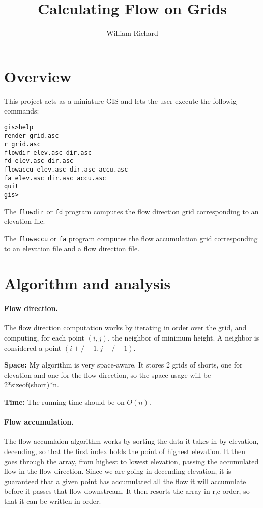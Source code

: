 \documentclass[11pt,twocolumn]{article}
\begin{document}
\title{Calculating Flow on Grids}
\author{William Richard}
\maketitle 



\section{Overview}

This project acts as a miniature GIS and lets the user execute the
followig commands: 
\begin{verbatim}
gis>help
render grid.asc
r grid.asc
flowdir elev.asc dir.asc
fd elev.asc dir.asc
flowaccu elev.asc dir.asc accu.asc
fa elev.asc dir.asc accu.asc
quit
gis>
\end{verbatim}

The \texttt{flowdir} or \texttt{fd} program computes the flow direction grid
corresponding to an elevation file. 


The \texttt{flowaccu} or \texttt{fa} program computes the flow accumulation grid
corresponding to an elevation file and a flow direction file.


\section{Algorithm and analysis}

\paragraph{Flow direction. }
The flow direction computation works by
iterating in order over the grid, and computing, for each point
$(i,j)$, the neighbor of minimum height. A neighbor is considered a
point $(i+/-1, j+/-1)$.

{\bf Space:} My algorithm is very space-aware. It stores 2 grids of
shorts, one for elevation and one for the flow direction, so the space
usage will be 2*sizeof(short)*n. 

{\bf Time: } The running time should be on $O(n)$.


\paragraph{Flow accumulation.} The flow accumlaion algorithm works by
sorting the data it takes in by elevation, decending, so that the
first index holds the point of highest elevation.  It then goes
through the array, from highest to lowest elevation, passing the
accumulated flow in the flow direction.  Since we are going in
decending elevation, it is guaranteed that a given point has
accumulated all the flow it will accumulate before it passes that flow
downstream.  It then resorts the array in r,c order, so that it can be
written in order.
\end{document}
